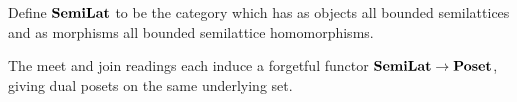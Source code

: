 \begin{definition}
Define $\mathbf{SemiLat}$ to be the category which has as objects all bounded semilattices and as morphisms all
bounded semilattice homomorphisms.
\end{definition}

\noindent The meet and join readings each induce a forgetful functor $\mathbf{SemiLat} \to \mathbf{Poset}$, giving dual
posets on the same underlying set.
